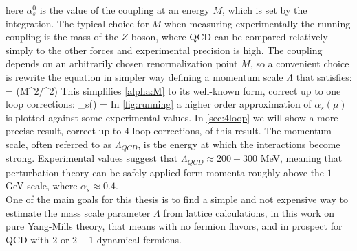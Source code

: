    \label{alpha:M}
\eeq  
here $\alpha_s^0$ is the value of the coupling at an energy $M$, which is set by the integration. The typical choice for $M$ when measuring experimentally the running coupling is the mass of the $Z$ boson, where QCD can be compared relatively simply to the other forces and experimental precision is high. The coupling depends on an arbitrarily chosen renormalization point $M$, so a convenient choice is rewrite the equation in  simpler way defining a momentum scale $\Lambda$ that satisfies:
 = \log(M^2/\Lambda^2) 
\eeq  
This simplifies \cref{alpha:M} to its well-known form, correct up to one loop corrections:
\beq
    \alpha_s(\mu) = 
    \label{alpha:1loop} 
\eeq
In \cref{fig:running} a higher order approximation of $\alpha_s(\mu)$ is plotted against some experimental values. 
In \cref{sec:4loop} we will show a more precise result, correct up to 4 loop corrections, of this result. The momentum scale, often referred to as $\Lambda_{QCD}$, is the energy at which the interactions become strong. Experimental values \cite{dissertori_9._2016} suggest that $\Lambda_{QCD} \approx 200-300$ MeV, meaning that perturbation theory can be safely applied form momenta roughly above the $1$ GeV scale, where $\alpha_s\approx 0.4$. \\
One of the main goals for this thesis is to find a simple and not expensive way to estimate the mass scale parameter $\Lambda$ from lattice calculations, in this work on pure Yang-Mills theory, that means with no fermion flavors, and in prospect for QCD with $2$ or $2+1$ dynamical fermions. 

